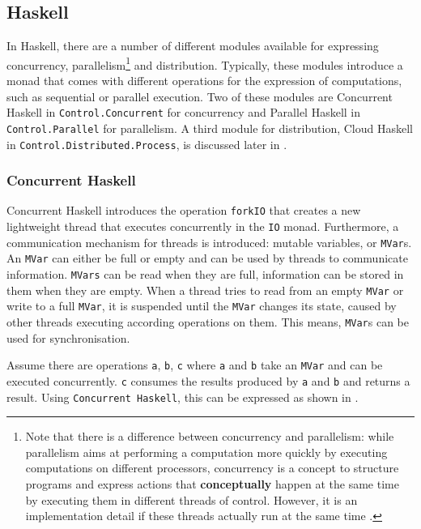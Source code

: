\subsection{Haskell}
In \textsf{Haskell}, there are a number of different modules available for expressing concurrency, parallelism\footnote{Note that there is a difference between concurrency and parallelism: while parallelism aims at performing a computation more quickly by executing computations on different processors, concurrency is a concept to structure programs and express actions that \textbf{conceptually} happen at the same time by executing them in different threads of control. However, it is an implementation detail if these threads actually run at the same time \cite{Marlow}.} and distribution. Typically, these modules introduce a monad that comes with different operations for the expression of computations, such as sequential or parallel execution. Two of these modules are \textsf{Concurrent Haskell} in \texttt{Control.Concurrent} for concurrency and \textsf{Parallel Haskell} in \texttt{Control.Parallel} for parallelism. A third module for distribution, \textsf{Cloud Haskell} in \texttt{Control.Distributed.Process}, is discussed later in .

\subsubsection{Concurrent Haskell}
\textsf{Concurrent Haskell} introduces the operation \texttt{forkIO} that creates a new lightweight thread that executes concurrently in the \texttt{IO} monad. Furthermore, a communication mechanism for threads is introduced: mutable variables, or \texttt{MVar}s. An \texttt{MVar} can either be full or empty and can be used by threads to communicate information. \texttt{MVars} can be read when they are full, information can be stored in them when they are empty. When a thread tries to read from an empty \texttt{MVar} or write to a full \texttt{MVar}, it is suspended until the \texttt{MVar} changes its state, caused by other threads executing according operations on them. This means, \texttt{MVar}s can be used for synchronisation.

Assume there are operations \texttt{a}, \texttt{b}, \texttt{c} where \texttt{a} and \texttt{b} take an \texttt{MVar} and can be executed concurrently. \texttt{c} consumes the results produced by \texttt{a} and \texttt{b} and returns a result. Using \texttt{Concurrent Haskell}, this can be expressed as shown in .

